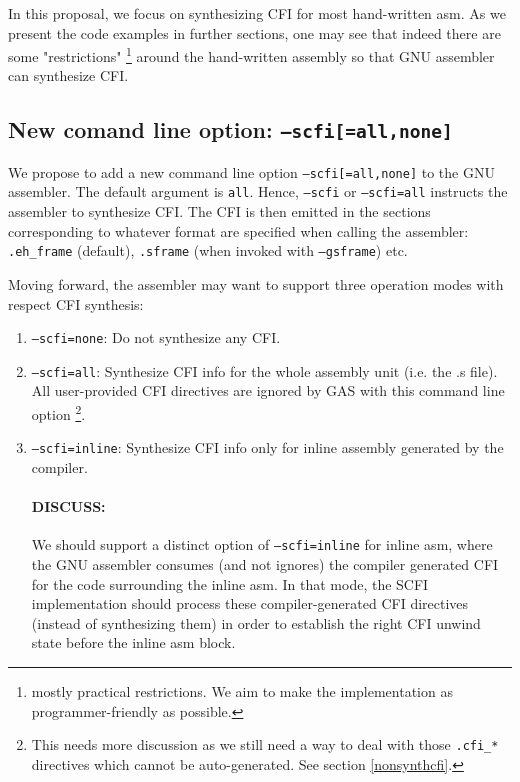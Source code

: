\documentclass{article} \usepackage[a4paper, total={6in, 8in}]{geometry}
\begin{document}
In this proposal, we focus on synthesizing CFI for most hand-written asm.
As we present the code examples in further sections, one may see that indeed
there are some "restrictions" \footnote{mostly practical restrictions.  We aim
to make the implementation as programmer-friendly as possible.} around the
hand-written assembly so that GNU assembler can synthesize CFI.

\subsection{New comand line option: \texttt{--scfi[=all,none]}}

We propose to add a new command line option \texttt{--scfi[=all,none]} to the
GNU assembler.  The default argument is \texttt{all}.  Hence, \texttt{--scfi}
or \texttt{--scfi=all} instructs the assembler to synthesize CFI.  The CFI is
then emitted in the sections corresponding to whatever format are specified when
calling the assembler: \texttt{.eh\_frame} (default), \texttt{.sframe} (when
invoked with \texttt{--gsframe}) etc.

Moving forward, the assembler may want to support three operation modes with
respect CFI synthesis:

\begin{enumerate}

\item \texttt{--scfi=none}: Do not synthesize any CFI.
\item \texttt{--scfi=all}: Synthesize CFI info for the whole assembly unit
(i.e. the .s file).  All user-provided CFI directives are ignored by GAS with
this command line option \footnote{This needs more discussion as we still need
a way to deal with those \texttt{.cfi\_*} directives which cannot be
auto-generated. See section \ref{nonsynthcfi}.}.
\item \texttt{--scfi=inline}: Synthesize CFI info only for inline assembly
generated by the compiler.

\paragraph{DISCUSS:} We should support a distinct option of
\texttt{--scfi=inline} for inline asm, where the GNU assembler consumes (and
not ignores) the compiler generated CFI for the code surrounding the inline
asm.  In that mode, the SCFI implementation should process these
compiler-generated CFI directives (instead of synthesizing them) in order to
establish the right CFI unwind state before the inline asm block.

\end{enumerate}
\end{document}
